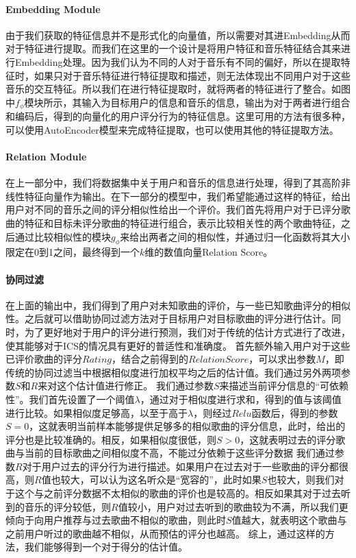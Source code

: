 \paragraph{Embedding Module}
由于我们获取的特征信息并不是形式化的向量值，所以需要对其进Embedding从而对于特征进行提取。而我们在这里的一个设计是将用户特征和音乐特征结合其来进行Embedding处理。因为我们认为不同的人对于音乐有不同的偏好，所以在提取特征时，如果只对于音乐特征进行特征提取和描述，则无法体现出不同用户对于这些音乐的交互特征。所以我们在进行特征提取时，就将两者的特征进行了整合。如图中$f_{\phi}$模块所示，其输入为目标用户的信息和音乐的信息，输出为对于两者进行组合和编码后，得到的向量化的用户评分行为的特征信息。这里可用的方法有很多种，可以使用AutoEncoder模型来完成特征提取，也可以使用其他的特征提取方法。

\paragraph{Relation Module}
在上一部分中，我们将数据集中关于用户和音乐的信息进行处理，得到了其高阶非线性特征向量作为输出。在下一部分的模型中，我们希望能通过这样的特征，给出用户对不同的音乐之间的评分相似性给出一个评价。我们首先将用户对于已评分歌曲的特征和目标未评分歌曲的特征进行组合，表示比较相关性的两个歌曲特征，之后通过比较相似性的模块$g_{\phi}$来给出两者之间的相似性，并通过归一化函数将其大小限定在0到1之间，最终得到一个$k$维的数值向量Relation Score。

\paragraph{协同过滤}
在上面的输出中，我们得到了用户对未知歌曲的评价，与一些已知歌曲评分的相似性。之后就可以借助协同过滤方法对于目标用户对目标歌曲的评分进行估计。同时，为了更好地对于用户的评分进行预测，我们对于传统的估计方式进行了改进，使其能够对于ICS的情况具有更好的普适性和准确度。
首先额外输入用户对于这些已评价歌曲的评分$Rating$，结合之前得到的$Relation Score$，可以求出参数$M$，即传统的协同过滤当中根据相似度进行加权平均之后的估计值。我们通过另外两项参数$S$和$R$来对这个估计值进行修正。
我们通过参数$S$来描述当前评分信息的“可依赖性”。我们首先设置了一个阈值$\lambda$，通过对于相似度进行求和，得到的值与该阈值进行比较。如果相似度足够高，以至于高于$\lambda$，则经过$Relu$函数后，得到的参数$S=0$，这就表明当前样本能够提供足够多的相似歌曲的评分信息，此时，给出的评分也是比较准确的。相反，如果相似度很低，则$S>0$，这就表明过去的评分歌曲与当前的目标歌曲之间相似度不高，不能过分依赖于这些评分数据
我们通过参数$R$对于用户过去的评分行为进行描述。如果用户在过去对于一些歌曲的评分都很高，则$R$值也较大，可以认为这名听众是“宽容的”，此时如果$S$也较大，则我们对于这个与之前评分数据不太相似的歌曲的评价也是较高的。相反如果其对于过去听到的音乐的评分较低，则$R$值较小，用户对过去听到的歌曲较为不满，所以我们更倾向于向用户推荐与过去歌曲不相似的歌曲，则此时$S$值越大，就表明这个歌曲与之前用户听过的歌曲越不相似，从而预估的评分也越高。
综上，通过这样的方法，我们能够得到一个对于得分的估计值。

